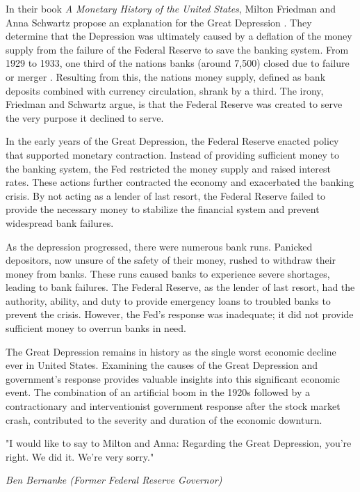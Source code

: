 \documentclass[12pt]{article}
\begin{document}
In their book \textit{A Monetary History of the United States}, Milton Friedman
and Anna Schwartz propose an explanation for the Great Depression
\autocite{amonetaryhistory}. They determine that the Depression was ultimately
caused by a deflation of the money supply from the failure of the Federal
Reserve to save the banking system. From 1929 to 1933, one third of the nations
banks (around 7,500) closed due to failure or merger \autocite{nber}. Resulting
from this, the nations money supply, defined as bank deposits combined with
currency circulation, shrank by a third. The irony, Friedman and Schwartz
argue, is that the Federal Reserve was created to serve the very purpose it
declined to serve.

In the early years of the Great Depression, the Federal Reserve enacted policy
that supported monetary contraction. Instead of providing sufficient money to
the banking system, the Fed restricted the money supply and raised interest
rates. These actions further contracted the economy and exacerbated the banking
crisis. By not acting as a lender of last resort, the Federal Reserve failed to
provide the necessary money to stabilize the financial system and prevent
widespread bank failures.

As the depression progressed, there were numerous bank runs. Panicked
depositors, now unsure of the safety of their money, rushed to withdraw their
money from banks. These runs caused banks to experience severe shortages,
leading to bank failures. The Federal Reserve, as the lender of last resort,
had the authority, ability, and duty to provide emergency loans to troubled
banks to prevent the crisis. However, the Fed’s response was inadequate; it did
not provide sufficient money to overrun banks in need.


The Great Depression remains in history as the single worst economic decline
ever in United States. Examining the causes of the Great Depression and
government's response provides valuable insights into this significant economic
event. The combination of an artificial boom in the 1920s followed by a
contractionary and interventionist government response after the stock market
crash, contributed to the severity and duration of the economic downturn.

\setlength{\epigraphwidth}{0.8\textwidth}
\epigraph{"I would like to say to Milton and Anna: Regarding the Great Depression, you’re
right. We did it. We’re very sorry."}{\textit{Ben Bernanke (Former Federal Reserve Governor)}}


\newpage
\printbibliography
\end{document}
